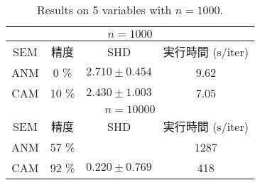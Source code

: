 \documentclass[dvipdfmx]{jsarticle}
\begin{document}

\begin{table}[hbtp]
    \centering
    \caption{Results on 5 variables with $n=1000$.}
    \label{5vars}
    \begin{tabular}[t]{|c||c|c|c|} 
    \hline 
    \multicolumn{4}{|c|}{$n=1000$} \\
    \hline
    SEM  & 精度 & SHD & 実行時間 (s/iter) \\
    \hline \hline
    ANM & 0 \% & $2.710 \pm 0.454$ &  9.62 \\ \hline
    CAM & 10 \% & $ 2.430 \pm 1.003$ & 7.05 \\ \hline \hline
    \multicolumn{4}{|c|}{$n=10000$} \\ \hline
    SEM  & 精度 & SHD & 実行時間 (s/iter) \\ \hline \hline
    ANM & 57 \% &  &  1287 \\ \hline
    CAM & 92 \% & $0.220 \pm 0.769$ & 418 \\ \hline
    \end{tabular}
\end{table}




\end{document}
